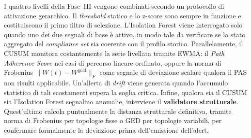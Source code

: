 I quattro livelli della Fase~III vengono combinati secondo un protocollo di attivazione gerarchico.
Il \textit{threshold} statico e lo z-score sono sempre in funzione e costituiscono il primo filtro
di selezione. L'Isolation Forest viene interrogato solo quando uno dei due segnali di base è attivo,
in modo tale da verificare se lo stato aggregato del \textit{compliance set} sia coerente con il
profilo storico. Parallelamente, il \gls{CUSUM} monitora costantemente la serie livellata tramite \gls{EWMA}: 
il \textit{Path Adherence Score} nei casi di percorso lineare ordinato, oppure la norma di Frobenius 
$\|W(t) - W^{\text{gold}}\|_F$ come segnale di deviazione scalare qualora il \gls{PAS} non risulti applicabile.
Un'allerta di \textit{drift} viene generata quando l'accumulo statistico di tali scostamenti supera 
la soglia critica. Infine, qualora sia il \gls{CUSUM} sia l'Isolation Forest segnalino anomalie, 
interviene il \textbf{validatore strutturale}. Quest'ultimo calcola puntualmente la distanza strutturale 
definitiva, tramite norma di Frobenius per topologie fisse o \gls{GED} per topologie variabili, 
per confermare formalmente la deviazione prima dell'emissione dell'alert.


